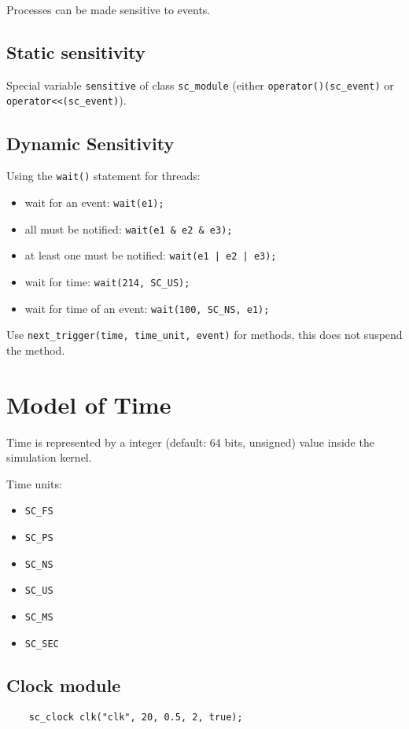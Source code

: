 Processes can be made sensitive to events.

\subsection{Static sensitivity}
Special variable \lstinline{sensitive} of class \lstinline{sc_module} (either \lstinline{operator()(sc_event)} or \lstinline{operator<<(sc_event)}).

\subsection{Dynamic Sensitivity}
Using the \lstinline{wait()} statement for threads:
\begin{itemize}
    \item wait for an event: \lstinline{wait(e1);}
    \item all must be notified: \lstinline{wait(e1 & e2 & e3);}
    \item at least one must be notified: \lstinline{wait(e1 | e2 | e3);}
    \item wait for time: \lstinline{wait(214, SC_US);}
    \item wait for time of an event: \lstinline{wait(100, SC_NS, e1);}
\end{itemize}

Use \lstinline{next_trigger(time, time_unit, event)} for methods, this does not suspend the method.

\section{Model of Time}
Time is represented by a integer (default: 64 bits, unsigned) value inside the simulation kernel.

Time units:
\begin{itemize}
    \item \lstinline{SC_FS}
    \item \lstinline{SC_PS}
    \item \lstinline{SC_NS}
    \item \lstinline{SC_US}
    \item \lstinline{SC_MS}
    \item \lstinline{SC_SEC}
\end{itemize}

\subsection{Clock module}
\begin{lstlisting}
    sc_clock clk("clk", 20, 0.5, 2, true);
\end{lstlisting}

